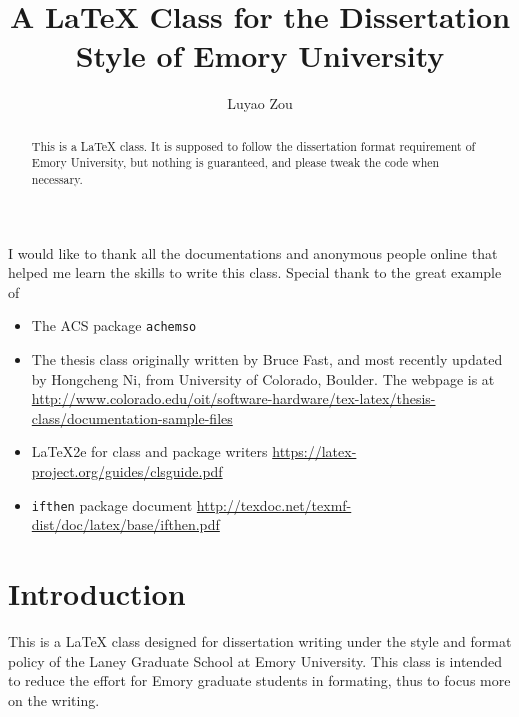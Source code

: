 \documentclass[draft, twoside]{emory}
\title{A \LaTeX{} Class for the Dissertation Style of Emory University}
\author{Luyao Zou}                      %
\begin{document}
\begin{abstract}

This is a \LaTeX{} class. It is supposed to follow the dissertation format
requirement of Emory University, but nothing is guaranteed, and please tweak the
code when necessary. 

\end{abstract}

\begin{acknowledgement}%

I would like to thank all the documentations and anonymous people online that
helped me learn the skills to write this class. 
Special thank to the great example of 

\begin{itemize}
  \item The ACS package \Verb|achemso|
  \item The thesis class originally written by Bruce Fast, and most recently updated by Hongcheng Ni, from University of Colorado, Boulder. 
        The webpage is at 
        \url{
        http://www.colorado.edu/oit/software-hardware/tex-latex/thesis-class/documentation-sample-files
        }
  \item LaTeX2e for class and package writers \url{https://latex-project.org/guides/clsguide.pdf}
  \item \Verb|ifthen| package document \url{http://texdoc.net/texmf-dist/doc/latex/base/ifthen.pdf}
\end{itemize}

\end{acknowledgement}

\maketoc

\chapter{Introduction}

This is a \LaTeX{} class designed for dissertation writing under the style and
format policy of the Laney Graduate School at Emory University.\cite{emory-style}
This class is
intended to reduce the effort for Emory graduate students in formating, thus 
to focus more on the writing. 
\end{document}
